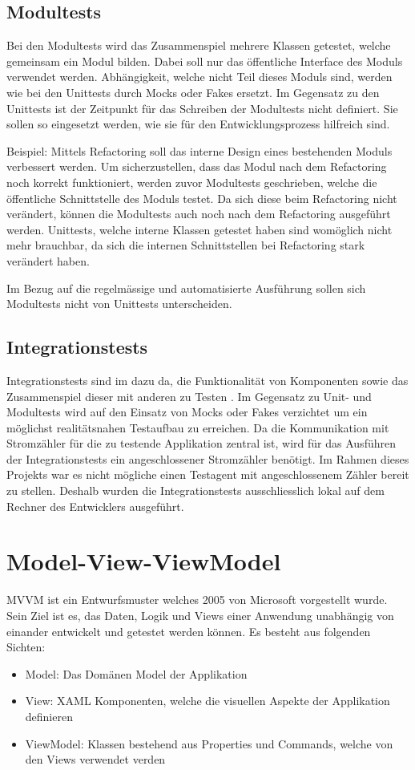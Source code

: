 \subsection{Modultests}
Bei den Modultests wird das Zusammenspiel mehrere Klassen getestet, welche gemeinsam ein Modul bilden.
Dabei soll nur das öffentliche Interface des Moduls verwendet werden.
Abhängigkeit, welche nicht Teil dieses Moduls sind, werden wie bei den Unittests durch Mocks oder Fakes ersetzt.
Im Gegensatz zu den Unittests ist der Zeitpunkt für das Schreiben der Modultests nicht definiert.
Sie sollen so eingesetzt werden, wie sie für den Entwicklungsprozess hilfreich sind.

Beispiel: Mittels Refactoring soll das interne Design eines bestehenden Moduls verbessert werden.
Um sicherzustellen, dass das Modul nach dem Refactoring noch korrekt funktioniert, werden zuvor Modultests geschrieben, welche die öffentliche Schnittstelle des Moduls testet.
Da sich diese beim Refactoring nicht verändert, können die Modultests auch noch nach dem Refactoring ausgeführt werden.
Unittests, welche interne Klassen getestet haben sind womöglich nicht mehr brauchbar, da sich die internen Schnittstellen bei Refactoring stark verändert haben.

Im Bezug auf die regelmässige und automatisierte Ausführung sollen sich Modultests nicht von Unittests unterscheiden.


\subsection{Integrationstests}\label{Integrationstests}
Integrationstests sind im dazu da, die Funktionalität von Komponenten sowie das Zusammenspiel dieser mit anderen zu Testen \parencite{winter2012integrationstest}.
Im Gegensatz zu Unit- und Modultests wird auf den Einsatz von Mocks oder Fakes verzichtet um ein möglichst realitätsnahen Testaufbau zu erreichen.
Da die Kommunikation mit Stromzähler für die zu testende Applikation zentral ist, wird für das Ausführen der Integrationstests ein angeschlossener Stromzähler benötigt.
Im Rahmen dieses Projekts war es nicht mögliche einen Testagent mit angeschlossenem Zähler bereit zu stellen.
Deshalb wurden die Integrationstests ausschliesslich lokal auf dem Rechner des Entwicklers ausgeführt.


\section{Model-View-ViewModel}\label{mvvm}
\ac{MVVM} ist ein Entwurfsmuster welches 2005 von Microsoft vorgestellt wurde.
Sein Ziel ist es, das Daten, Logik und Views einer Anwendung unabhängig von einander entwickelt und getestet werden können.
Es besteht aus folgenden Sichten:
\begin{itemize}
   \item Model: Das Domänen Model der Applikation
   \item View: XAML Komponenten, welche die visuellen Aspekte der Applikation definieren
   \item ViewModel: Klassen bestehend aus Properties und Commands, welche von den Views verwendet verden
\end{itemize}

